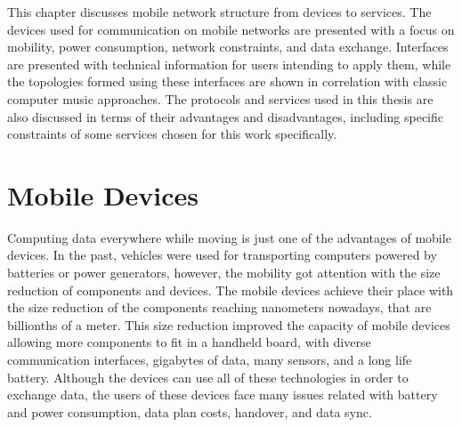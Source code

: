 This chapter discusses mobile network structure from devices to services.
The devices used for communication on mobile networks are presented with a focus on mobility, power consumption, network constraints, and data exchange.
Interfaces are presented with technical information for users intending to apply them, while the topologies formed using these interfaces are shown in correlation with classic computer music approaches.
The protocols and services used in this thesis are also discussed in terms of their advantages and disadvantages, including specific constraints of some services chosen for this work specifically.

\section{Mobile Devices}
\label{sec:mobiledevices}

Computing data everywhere while moving is just one of the advantages of mobile devices.
In the past, vehicles were used for transporting computers powered by batteries or power generators, however, the mobility got attention with the size reduction of components and devices.
The mobile devices achieve their place 
with the size reduction of the components reaching nanometers nowadays, that are billionths of a meter.
This size reduction improved the capacity of mobile devices allowing more components to fit in a handheld board, with diverse communication interfaces, gigabytes of data, many sensors, and a long life battery.
Although the devices can use all of these technologies in order to exchange data, the users of these devices face many issues related with
battery and power consumption, data plan costs, handover, and data sync.

